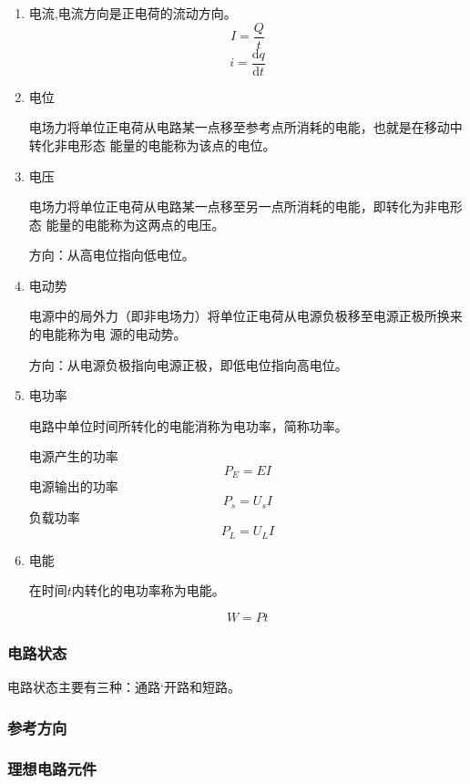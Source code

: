 \documentclass[12pt, a4paper, oneside]{ctexart}%
\begin{document}
\begin{enumerate}
\item 电流,电流方向是正电荷的流动方向。
\[
    I = \frac{Q}{t}
\]
\[
    i = \frac{\mathrm{d} q}{\mathrm{d} t} 
\]

\item 电位 

电场力将单位正电荷从电路某一点移至参考点所消耗的电能，也就是在移动中转化非电形态
能量的电能称为该点的电位。

\item 电压

电场力将单位正电荷从电路某一点移至另一点所消耗的电能，即转化为非电形态
能量的电能称为这两点的电压。

方向：从高电位指向低电位。

\item 电动势

电源中的局外力（即非电场力）将单位正电荷从电源负极移至电源正极所换来的电能称为电
源的电动势。

方向：从电源负极指向电源正极，即低电位指向高电位。

\item 电功率

电路中单位时间所转化的电能消称为电功率，简称功率。

电源产生的功率
\[
    P_E=EI
\]
电源输出的功率
\[
    P_s=U_sI
\]
负载功率
\[
    P_L=U_LI
\]

\item 电能

在时间$t$内转化的电功率称为电能。

\[
    W=Pt
\]

\end{enumerate}

\subsubsection{电路状态}

电路状态主要有三种：通路‘开路和短路。

\subsubsection{参考方向}

\begin{center}
\end{center}

\subsubsection{理想电路元件}
\end{document}

